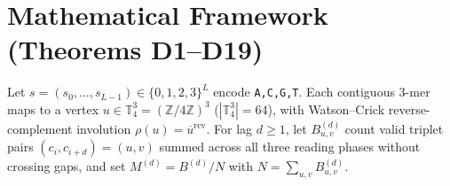 \documentclass[11pt,a4paper]{article}
\newcommand{\Ttorus}{\mathbb{T}_4^3}
\begin{document}
\section{Mathematical Framework (Theorems D1--D19)}
\label{sec:framework}

Let $s = (s_0,\dots,s_{L-1}) \in \{0,1,2,3\}^L$ encode \texttt{A,C,G,T}. Each contiguous 3-mer maps to a vertex $u \in \Ttorus = (\mathbb{Z}/4\mathbb{Z})^3$ ($|\Ttorus|=64$), with Watson--Crick reverse-complement involution $\rho(u) = \overline{u}^{\mathrm{rev}}$. For lag $d \ge 1$, let $B^{(d)}_{u,v}$ count valid triplet pairs $(c_i, c_{i+d}) = (u,v)$ summed across all three reading phases without crossing gaps, and set $M^{(d)} = B^{(d)} / N$ with $N = \sum_{u,v} B^{(d)}_{u,v}$.
\end{document}
